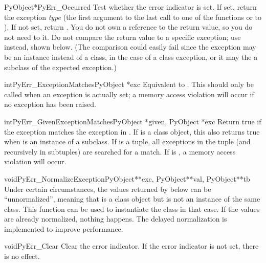 \documentclass{manual}
\begin{document}
\begin{cfuncdesc}{PyObject*}{PyErr_Occurred}{}
Test whether the error indicator is set.  If set, return the exception
\emph{type} (the first argument to the last call to one of the
 functions or to ).  If
not set, return \NULL{}.  You do not own a reference to the return
value, so you do not need to  it.
  Do not compare the return value to a specific
exception; use  instead, shown
below.  (The comparison could easily fail since the exception may be
an instance instead of a class, in the case of a class exception, or
it may the a subclass of the expected exception.)
\end{cfuncdesc}

\begin{cfuncdesc}{int}{PyErr_ExceptionMatches}{PyObject *exc}
Equivalent to
.
This should only be called when an exception is actually set; a memory 
access violation will occur if no exception has been raised.
\end{cfuncdesc}

\begin{cfuncdesc}{int}{PyErr_GivenExceptionMatches}{PyObject *given, PyObject *exc}
Return true if the  exception matches the exception in
.  If  is a class object, this also returns true
when  is an instance of a subclass.  If  is a tuple, all
exceptions in the tuple (and recursively in subtuples) are searched
for a match.  If  is \NULL, a memory access violation will
occur.
\end{cfuncdesc}

\begin{cfuncdesc}{void}{PyErr_NormalizeException}{PyObject**exc, PyObject**val, PyObject**tb}
Under certain circumstances, the values returned by
 below can be ``unnormalized'', meaning that
 is a class object but  is not an
instance of the  same class.  This function can be used to instantiate
the class in that case.  If the values are already normalized, nothing
happens.  The delayed normalization is implemented to improve
performance.
\end{cfuncdesc}

\begin{cfuncdesc}{void}{PyErr_Clear}{}
Clear the error indicator.  If the error indicator is not set, there
is no effect.
\end{cfuncdesc}
\end{document}
